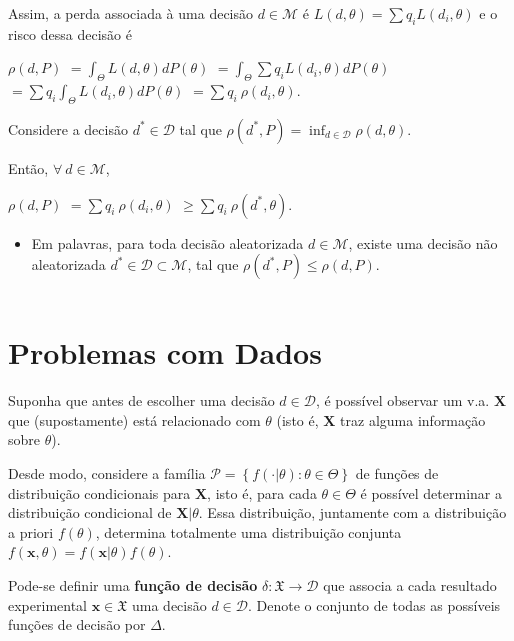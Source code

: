 \documentclass[
]{book}
\providecommand{\tightlist}{%
  \setlength{\itemsep}{0pt}\setlength{\parskip}{0pt}}
\begin{document}
Assim, a perda associada à uma decisão \(d\in\mathcal{M}\) é \(L(d,\theta) = \sum q_i L(d_i,\theta)\) e o risco dessa decisão é

\(\rho(d,P)\) \(= \displaystyle \int_\Theta L(d,\theta) dP(\theta)\) \(=\displaystyle \int_\Theta \sum q_i L(d_i,\theta) dP(\theta)\) \(=\displaystyle \sum q_i \int_\Theta L(d_i,\theta) dP(\theta)\) \(=\displaystyle \sum q_i~ \rho(d_i,\theta)\).

Considere a decisão \({d}^* \in \mathcal{D}\) tal que \(\rho({d}^*,P) = \displaystyle \inf_{d \in \mathcal{D}} \rho(d,\theta)\).

Então, \(\forall ~d \in \mathcal{M}\),

\(\rho(d,P)\) \(=\displaystyle \sum q_i~ \rho(d_i,\theta)\) \(\geq \displaystyle \sum q_i~ \rho({d}^*,\theta)\).

\begin{itemize}
\tightlist
\item
  Em palavras, para toda decisão aleatorizada \(d\in\mathcal{M}\), existe uma decisão não aleatorizada \({d}^*\in\mathcal{D} \subset\mathcal{M}\), tal que \(\rho({d}^*,P) \leq \rho(d,P)\).
\end{itemize}

\(~\)

\hypertarget{DecDados}{%
\section{Problemas com Dados}\label{DecDados}}

Suponha que antes de escolher uma decisão \(d \in \mathcal{D}\), é possível observar um v.a. \(\boldsymbol X\) que (supostamente) está relacionado com \(\theta\) (isto é, \(\boldsymbol X\) traz alguma informação sobre \(\theta\)).

Desde modo, considere a família \(\mathcal{P}=\left\{ f(\cdot|\theta) : \theta \in \Theta\right\}\) de funções de distribuição condicionais para \(\boldsymbol X\), isto é, para cada \(\theta \in \Theta\) é possível determinar a distribuição condicional de \(\boldsymbol X|\theta\). Essa distribuição, juntamente com a distribuição a priori \(f(\theta)\), determina totalmente uma distribuição conjunta \(f(\boldsymbol x,\theta) = f(\boldsymbol x|\theta) f(\theta)\).

Pode-se definir uma \textbf{função de decisão} \(\delta: \mathfrak{X} \longrightarrow \mathcal{D}\) que associa a cada resultado experimental \(\boldsymbol x \in \mathfrak{X}\) uma decisão \(d \in \mathcal{D}\). Denote o conjunto de todas as possíveis funções de decisão por \(\Delta\).
\end{document}
